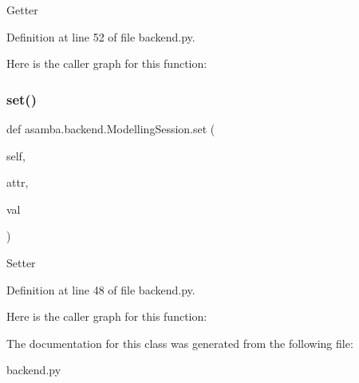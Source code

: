 \begin{DoxyVerb}Getter \end{DoxyVerb}
 

Definition at line 52 of file backend.\+py.

Here is the caller graph for this function\+:
\mbox{\label{classasamba_1_1backend_1_1_modelling_session_a83549fd610225e6edea77914b0f65f30}} 
\subsubsection{\texorpdfstring{set()}{set()}}
{\footnotesize\ttfamily def asamba.\+backend.\+Modelling\+Session.\+set (\begin{DoxyParamCaption}\item[{}]{self,  }\item[{}]{attr,  }\item[{}]{val }\end{DoxyParamCaption})}

\begin{DoxyVerb}Setter \end{DoxyVerb}
 

Definition at line 48 of file backend.\+py.

Here is the caller graph for this function\+:


The documentation for this class was generated from the following file\+:\begin{DoxyCompactItemize}
\item 
backend.\+py\end{DoxyCompactItemize}
